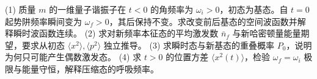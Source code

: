 (1) 质量 \(m\) 的一维量子谐振子在 \(t<0\) 的角频率为 \(\omega_i>0\)，初态为基态。自 \(t=0\) 起势阱频率瞬间变为 \(\omega_f>0\)，其后保持不变。求改变前后基态的空间波函数并解释瞬时波函数连续。
(2) 求对新频率本征态的平均激发数 \(\bar n_f\) 与新哈密顿量能量期望，要求从初态 \(\langle x^2\rangle,\langle p^2\rangle\) 独立推导。
(3) 求瞬时态与新基态的重叠概率 \(P_0\)，说明为何只可能产生偶数激发态。
(4) 求 \(t>0\) 的位置方差 \(\langle x^2(t)\rangle\)，检验 \(\omega_f=\omega_i\) 极限与能量守恒，解释压缩态的呼吸频率。
